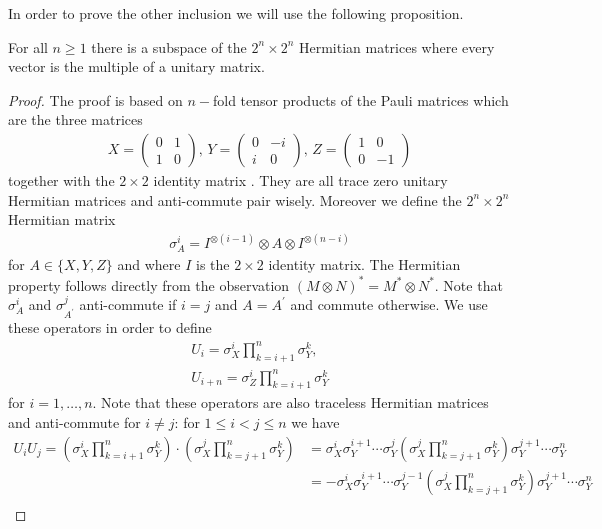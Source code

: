 \noindent In order to prove the other inclusion we will use the following proposition. 
\begin{prop} \label{PauliProp}
For all $ n \ge 1 $ there is a subspace of the $ 2^n \times 2^n $ Hermitian matrices where every vector is the multiple of a unitary matrix. 
\end{prop}
\begin{proof}
The proof is based on $ n- $fold tensor products of the Pauli matrices which are the three matrices 
\begin{align*}
X = \begin{pmatrix}
0 & 1 \\ 1 & 0
\end{pmatrix}, \, Y = \begin{pmatrix}
0 & -i \\ i & 0
\end{pmatrix}, \, Z = \begin{pmatrix}
1 & 0 \\ 0 & -1
\end{pmatrix}
\end{align*}
together with the $ 2 \times 2 $ identity matrix .
They are all trace zero unitary Hermitian matrices and anti-commute pair wisely. 
Moreover we define the $ 2^n \times 2^n $ Hermitian matrix 
\begin{align*}
\sigma_A^i = I^{\otimes (i-1)} \otimes A \otimes I^{\otimes (n-i)}
\end{align*}
for $ A \in \{ X,Y,Z \}$ and where $ I $ is the $ 2 \times 2 $ identity matrix. The Hermitian property follows directly from the observation $ (M \otimes N)^* = M^* \otimes N^* $.
Note that $ \sigma_A^i $ and $ \sigma_{A^{\prime}}^j $ anti-commute if $ i = j $ and $ A = A^{\prime} $ and commute otherwise. We use these operators in order to define 
\begin{align*}
U_i = \sigma_X^i \prod_{k = i+1}^{n}\sigma_Y^k, \\
U_{i+n} = \sigma_Z^i \prod_{k = i+1}^n \sigma_Y^k
\end{align*}
for $ i = 1,\hdots,n $. Note that these operators are also traceless Hermitian matrices and anti-commute for $ i \neq j $:    
for $ 1 \le i < j  \le n$ we have 
\begin{align*}
U_iU_j = (\sigma_X^i \prod_{k = i+1}^{n}\sigma_Y^k) \cdot( \sigma_X^j \prod_{k = j+1}^{n}\sigma_Y^k) &= \sigma_X^i \sigma_Y^{i+1} \cdots \sigma_Y^j ( \sigma_X^j \prod_{k = j+1}^{n}\sigma_Y^k) \sigma_Y^{j+1} \cdots \sigma_Y^n \\
&= - \sigma_X^i \sigma_Y^{i+1} \cdots \sigma_Y^{j-1} ( \sigma_X^j \prod_{k = j+1}^{n}\sigma_Y^k) \sigma_Y^{j+1} \cdots \sigma_Y^n  \\

\end{align*}
\end{proof}
